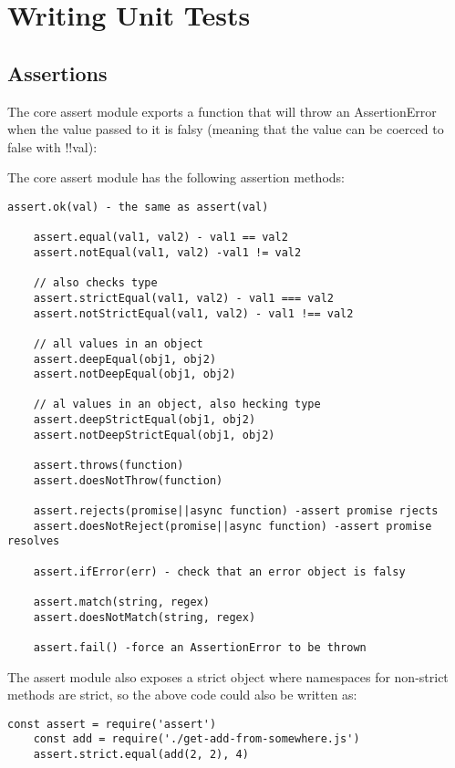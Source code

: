 \documentclass{scrartcl}
\begin{document}
\section{ Writing Unit Tests }

\subsection{Assertions}

 The core assert module exports a function that will throw an AssertionError when the value passed to it is falsy (meaning that the value can be coerced to false with !!val):

 The core assert module has the following assertion methods:

\begin{lstlisting}[style=ES6]
    assert.ok(val) - the same as assert(val)

    assert.equal(val1, val2) - val1 == val2
    assert.notEqual(val1, val2) -val1 != val2

    // also checks type
    assert.strictEqual(val1, val2) - val1 === val2
    assert.notStrictEqual(val1, val2) - val1 !== val2

    // all values in an object
    assert.deepEqual(obj1, obj2)
    assert.notDeepEqual(obj1, obj2)

    // al values in an object, also hecking type
    assert.deepStrictEqual(obj1, obj2)
    assert.notDeepStrictEqual(obj1, obj2)

    assert.throws(function)
    assert.doesNotThrow(function)

    assert.rejects(promise||async function) -assert promise rjects
    assert.doesNotReject(promise||async function) -assert promise resolves

    assert.ifError(err) - check that an error object is falsy

    assert.match(string, regex)
    assert.doesNotMatch(string, regex)

    assert.fail() -force an AssertionError to be thrown
\end{lstlisting}

The assert module also exposes a strict object where namespaces for non-strict methods are strict, so the above code could also be written as:

\begin{lstlisting}[style=ES6]
    const assert = require('assert')
    const add = require('./get-add-from-somewhere.js')
    assert.strict.equal(add(2, 2), 4)
\end{lstlisting}
\end{document}
